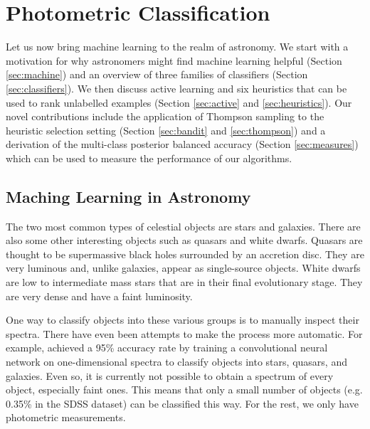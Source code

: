 

\chapter{Photometric Classification}
\label{cha:ml}

Let us now bring machine learning to the realm of astronomy. We start with a motivation for why
astronomers might find machine learning helpful (Section \ref{sec:machine}) and an overview of
three families of classifiers (Section \ref{sec:classifiers}). We then discuss active learning and
six heuristics that can be used to rank unlabelled examples (Section \ref{sec:active} and
\ref{sec:heuristics}). Our novel contributions include the application of Thompson sampling to the
heuristic selection setting  (Section \ref{sec:bandit} and \ref{sec:thompson}) and a derivation of
the multi-class posterior balanced accuracy (Section \ref{sec:measures}) which can be used to
measure the performance of our algorithms.


\section{Maching Learning in Astronomy} 
\label{sec:machine}

The two most common types of celestial objects are stars and galaxies. There are also some other
interesting objects such as quasars and white dwarfs. Quasars  are thought to be
supermassive black holes surrounded by an accretion disc. They are very luminous and, unlike
galaxies, appear as single-source objects. White dwarfs  are low to intermediate
mass stars that are in their final evolutionary stage. They are very dense and have a faint
luminosity.

One way to classify objects into these various groups is to manually inspect their spectra.
 There have even been attempts to make the process more automatic. For example,
 achieved a 95\% accuracy rate by training a convolutional neural network
 on one-dimensional spectra to classify objects into stars, quasars, and
galaxies. Even so, it is currently not possible to obtain a spectrum of every object, especially
faint ones. This means that only a small number of objects (e.g. 0.35\% in the SDSS dataset) can be
classified this way. For the rest, we only have photometric measurements.

